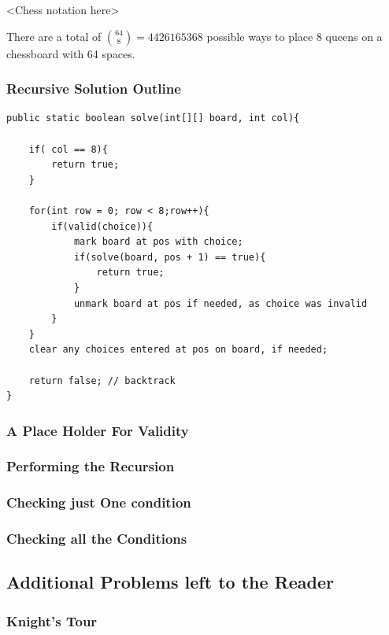 <Chess notation here>

There are a total of $\binom{64}{8} = 4426165368$
possible ways to place 8 queens on a chessboard with 64 spaces.

\subsubsection{Recursive Solution Outline}
\begin{verbatim}
public static boolean solve(int[][] board, int col){
	
	if( col == 8){
		return true;
	}
	
	for(int row = 0; row < 8;row++){
		if(valid(choice)){
			mark board at pos with choice;
			if(solve(board, pos + 1) == true){
				return true;
			}
			unmark board at pos if needed, as choice was invalid
		}
	}
	clear any choices entered at pos on board, if needed;
	
	return false; // backtrack
}

\end{verbatim}

\subsubsection{A Place Holder For Validity}

\subsubsection{Performing the Recursion}

\subsubsection{Checking just One condition}


\subsubsection{Checking all the Conditions}




\subsection{Additional Problems left to the Reader}

\subsubsection{Knight's Tour}

